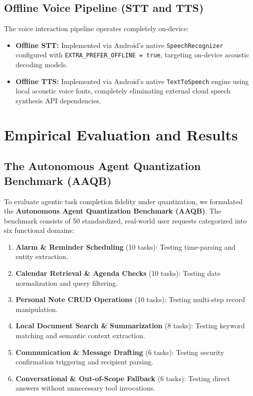 \documentclass[12pt,a4paper,oneside]{report}
\begin{document}
\section{Offline Voice Pipeline (STT and TTS)}
The voice interaction pipeline operates completely on-device:
\begin{itemize}
    \item \textbf{Offline STT:} Implemented via Android's native \texttt{SpeechRecognizer} configured with \texttt{EXTRA\_PREFER\_OFFLINE = true}, targeting on-device acoustic decoding models.
    \item \textbf{Offline TTS:} Implemented via Android's native \texttt{TextToSpeech} engine using local acoustic voice fonts, completely eliminating external cloud speech synthesis API dependencies.
\end{itemize}

\newpage
\chapter{Empirical Evaluation and Results}

\section{The Autonomous Agent Quantization Benchmark (AAQB)}
To evaluate agentic task completion fidelity under quantization, we formulated the \textbf{Autonomous Agent Quantization Benchmark (AAQB)}. The benchmark consists of 50 standardized, real-world user requests categorized into six functional domains:
\begin{enumerate}
    \item \textbf{Alarm \& Reminder Scheduling} (10 tasks): Testing time-parsing and entity extraction.
    \item \textbf{Calendar Retrieval \& Agenda Checks} (10 tasks): Testing date normalization and query filtering.
    \item \textbf{Personal Note CRUD Operations} (10 tasks): Testing multi-step record manipulation.
    \item \textbf{Local Document Search \& Summarization} (8 tasks): Testing keyword matching and semantic context extraction.
    \item \textbf{Communication \& Message Drafting} (6 tasks): Testing security confirmation triggering and recipient parsing.
    \item \textbf{Conversational \& Out-of-Scope Fallback} (6 tasks): Testing direct answers without unnecessary tool invocations.
\end{enumerate}
\end{document}
